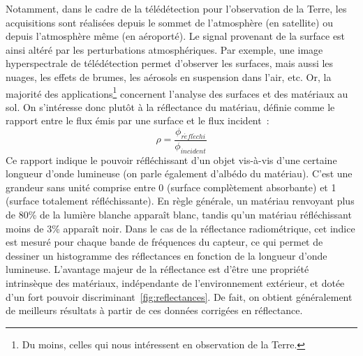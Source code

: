 Notamment, dans le cadre de la télédétection pour l'observation de la Terre, les acquisitions sont réalisées depuis le sommet de l'atmosphère (en satellite) ou depuis l'atmosphère même (en aéroporté). Le signal provenant de la surface est ainsi altéré par les perturbations atmosphériques. Par exemple, une image hyperspectrale de télédétection permet d'observer les surfaces, mais aussi les nuages, les effets de brumes, les aérosols en suspension dans l'air, etc. Or, la majorité des applications\footnote{Du moins, celles qui nous intéressent en observation de la Terre.} concernent l'analyse des surfaces et des matériaux au sol. On s'intéresse donc plutôt à la réflectance du matériau, définie comme le rapport entre le flux émis par une surface et le flux incident~:
$$\rho = \frac{\phi_{r\acute{e}fl\acute{e}chi}}{\phi_{incident}}$$
Ce rapport indique le pouvoir réfléchissant d'un objet vis-à-vis d'une certaine longueur d'onde lumineuse (on parle également d'albédo du matériau). C'est une grandeur sans unité comprise entre 0 (surface complètement absorbante) et 1 (surface totalement réfléchissante). En règle générale, un matériau renvoyant plus de 80\% de la lumière blanche apparaît blanc, tandis qu'un matériau réfléchissant moins de 3\% apparaît noir. Dans le cas de la réflectance radiométrique, cet indice est mesuré pour chaque bande de fréquences du capteur, ce qui permet de dessiner un histogramme des réflectances en fonction de la longueur d'onde lumineuse. L'avantage majeur de la réflectance est d'être une propriété intrinsèque des matériaux, indépendante de l'environnement extérieur, et dotée d'un fort pouvoir discriminant~\cref{fig:reflectances}. De fait, on obtient généralement de meilleurs résultats à partir de ces données corrigées en réflectance.

